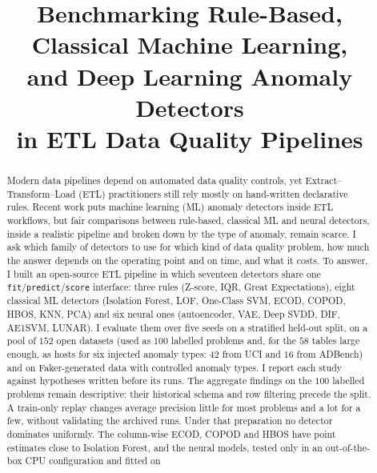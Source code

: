 \documentclass[conference]{IEEEtran}
\begin{document}
\title{Benchmarking Rule-Based, Classical Machine Learning,\\
and Deep Learning Anomaly Detectors\\
in ETL Data Quality Pipelines}

\author{
}

\maketitle

\begin{abstract}
Modern data pipelines depend on automated data quality controls, yet Extract--Transform--Load
(ETL) practitioners still rely mostly on hand-written declarative rules. Recent work puts
machine learning (ML) anomaly detectors inside ETL workflows, but fair comparisons between
rule-based, classical ML and neural detectors, inside a realistic pipeline and broken down by
the type of anomaly, remain scarce. I ask which family of detectors to use for which kind of
data quality problem, how much the answer depends on the operating point and on time, and what
it costs. To answer, I built an open-source ETL pipeline in which seventeen detectors share one
\texttt{fit}/\texttt{predict}/\texttt{score} interface: three rules (Z-score, IQR, Great
Expectations), eight classical ML detectors (Isolation Forest, LOF, One-Class SVM, ECOD, COPOD, HBOS,
KNN, PCA) and six neural ones (autoencoder, VAE, Deep SVDD, DIF, AE1SVM, LUNAR). I evaluate them over
five seeds on a stratified held-out split, on a pool of $152$ open datasets (used as $100$ labelled
problems and, for the $58$ tables large enough, as hosts for six injected anomaly types: $42$ from UCI
and $16$ from ADBench) and on Faker-generated data with controlled anomaly types. I report each study against hypotheses written before its runs. The aggregate findings on the $100$ labelled
problems remain descriptive: their historical schema and row filtering precede the split. A train-only replay changes
average precision little for most problems and a lot for a few, without validating the archived runs. Under that preparation no detector dominates uniformly. The column-wise ECOD, COPOD and HBOS have point
estimates close to Isolation Forest, and the neural models, tested only in an out-of-the-box CPU configuration and fitted on

\end{abstract}
\end{document}
